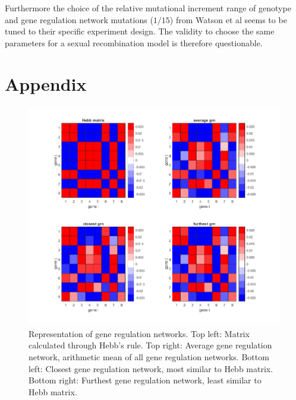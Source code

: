 \documentclass{article}
\begin{document}
Furthermore the choice of the relative mutational increment range of genotype and gene regulation network mutations ($1/15$) from Watson et al seems to be tuned to their specific experiment design. The validity to choose the same parameters for a sexual recombination model is therefore questionable.

\section{Appendix}

\begin{figure}[H]
	\includegraphics[width=\linewidth]{./img/results/pop100.png}
	\caption{Representation of gene regulation networks. Top left: Matrix calculated through Hebb's rule. Top right: Average gene regulation network, arithmetic mean of all gene regulation networks. Bottom left: Closest gene regulation network, most similar to Hebb matrix. Bottom right: Furthest gene regulation network, least similar to Hebb matrix.}
	\label{fig:pop100}
\end{figure}


\begin{appendix}
   
  
\end{appendix}
\end{document}
